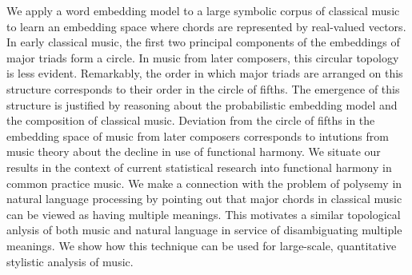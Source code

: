 
We apply a word embedding model to a large symbolic corpus of classical music to learn an embedding space where chords are represented by real-valued vectors.
In early classical music, the first two principal components of the embeddings of major triads form a circle. In music from later composers, this circular topology is less evident. 
Remarkably, the order in which major triads are arranged on this structure corresponds to their order in the circle of fifths.
The emergence of this structure is justified by reasoning about the probabilistic embedding model and the composition of classical music.
Deviation from the circle of fifths in the embedding space of music from later composers corresponds to intutions from music theory about the decline in use of functional harmony.
We situate our results in the context of current statistical research into functional harmony in common practice music. We make a connection with the problem of polysemy in natural language processing by pointing out that major chords in classical music can be viewed as having multiple meanings. This motivates a similar topological anlysis of both music and natural language in service of disambiguating multiple meanings.
We show how this technique can be used for large-scale, quantitative stylistic analysis of music.
